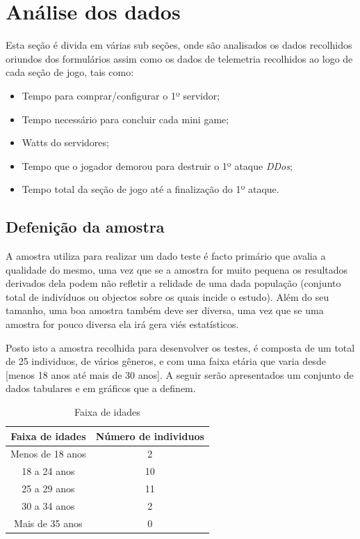 \section{Análise dos dados}

Esta seção é divida em várias sub seções, onde são analisados os dados recolhidos oriundos dos formulários assim como os dados de telemetria recolhidos ao logo de cada seção de jogo, tais como:
\begin{itemize}
    \item Tempo para comprar/configurar o 1º servidor;
    \item Tempo necessário para concluir cada mini game;
    \item Watts do servidores;
    \item Tempo que o jogador demorou para destruir o 1º ataque \textit{DDos};
    \item Tempo total da seção de jogo até a finalização do 1º ataque.
\end{itemize}

\subsection{Defenição da amostra}
\label{Sec:DefAmostra}

A amostra utiliza para realizar um dado teste é facto primário que avalia a qualidade do mesmo, uma vez que se a amostra for muito pequena os resultados derivados dela podem não refletir a relidade de uma dada população (conjunto total de indivíduos ou objectos sobre os quais incide o estudo). Além do seu tamanho, uma boa amostra também deve ser diversa, uma vez que se uma amostra for pouco diversa ela irá gera viés estatísticos.

Posto isto a amostra recolhida para desenvolver os testes, é composta de um total de 25 individuos, de vários gêneros, e com uma faixa etária que varia desde [menos 18 anos até mais de 30 anos]. A seguir serão apresentados um conjunto de dados tabulares e em gráficos que a definem.

\begin{table}[H]
    \centering
    \begin{tabular}{|c|c|}
        \hline
        \textbf{Faixa de idades} & \textbf{Número de individuos} \\ \hline
        Menos de 18 anos & 2 \\ \hline
        18 a 24 anos & 10 \\ \hline
        25 a 29 anos & 11 \\ \hline
        30 a 34 anos & 2 \\ \hline
        Mais de 35 anos & 0 \\ \hline
    \end{tabular}
    \caption{Faixa de idades}
    \label{tab:Faixa_Idades}
\end{table}


